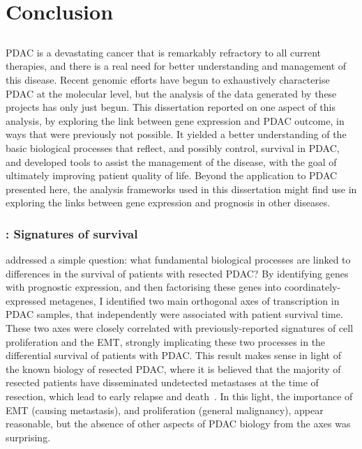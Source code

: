\documentclass[thesis.tex]{subfiles}
\begin{document}
\chapter[Conclusion]{Conclusion}
\label{chap:conc}

\section*{}

\Acrlong{PDAC} is a devastating cancer that is remarkably refractory to all current therapies, and there is a real need for better understanding and management of this disease.  Recent genomic efforts have begun to exhaustively characterise \gls{PDAC} at the molecular level, but the analysis of the data generated by these projects has only just begun.  This dissertation reported on one aspect of this analysis, by exploring the link between gene expression and \gls{PDAC} outcome, in ways that were previously not possible.  It yielded a better understanding of the basic biological processes that reflect, and possibly control, survival in \gls{PDAC}, and developed tools to assist the management of the disease, with the goal of ultimately improving patient quality of life.  Beyond the application to \gls{PDAC} presented here, the analysis frameworks used in this dissertation might find use in exploring the links between gene expression and prognosis in other diseases.

\subsection{\texorpdfstring{}{Chapter 2}: Signatures of survival}
 addressed a simple question: what fundamental biological processes are linked to differences in the survival of patients with resected \gls{PDAC}?  By identifying genes with prognostic expression, and then factorising these genes into coordinately-expressed metagenes, I identified two main orthogonal axes of transcription in \gls{PDAC} samples, that independently were associated with patient survival time.  These two axes were closely correlated with previously-reported signatures of cell proliferation and the \gls{EMT}, strongly implicating these two processes in the differential survival of patients with \gls{PDAC}.  This result makes sense in light of the known biology of resected \gls{PDAC}, where it is believed that the majority of resected patients have disseminated undetected metastases at the time of resection, which lead to early relapse and death~\cite{Barugola2007}.  In this light, the importance of \gls{EMT} (causing metastasis), and proliferation (general malignancy), appear reasonable, but the absence of other aspects of \gls{PDAC} biology from the axes was surprising.
\end{document}
